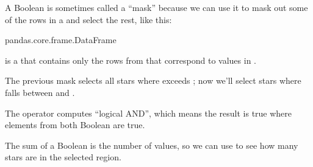 \documentclass[letterpaper,10pt,english]{sphinxmanual}
\begin{document}
A Boolean  is sometimes called a “mask” because we can use it to mask out some of the rows in a  and select the rest, like this:

\begin{sphinxVerbatim}[commandchars=\\\{\}]
  \PYG{p}{[}\PYG{p}{]}
\end{sphinxVerbatim}

\begin{sphinxVerbatim}[commandchars=\\\{\}]
pandas.core.frame.DataFrame
\end{sphinxVerbatim}

 is a  that contains only the rows from  that correspond to  values in .

The previous mask selects all stars where  exceeds ; now we’ll select stars where  falls between  and .

\begin{sphinxVerbatim}[commandchars=\\\{\}]
  \PYG{p}{[}\PYG{p}{]}    
            \PYG{p}{[}\PYG{p}{]}  
\end{sphinxVerbatim}

The \sphinxcode{\sphinxupquote{\&}} operator computes “logical AND”, which means the result is true where elements from both Boolean  are true.

The sum of a Boolean  is the number of  values, so we can use  to see how many stars are in the selected region.

\begin{sphinxVerbatim}[commandchars=\\\{\}]
\end{sphinxVerbatim}
\end{document}
